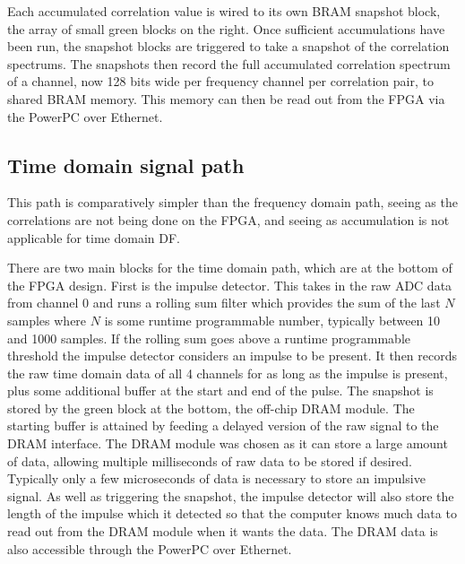 Each accumulated correlation value is wired to its own BRAM snapshot block, the array of small green blocks on the right. Once sufficient accumulations have been run, the snapshot blocks are triggered to take a snapshot of the correlation spectrums. The snapshots then record the full accumulated correlation spectrum of a channel, now 128 bits wide per frequency channel per correlation pair, to shared BRAM memory. This memory can then be read out from the FPGA via the PowerPC over Ethernet.

\subsection{Time domain signal path}
This path is comparatively simpler than the frequency domain path, seeing as the correlations are not being done on the FPGA, and seeing as accumulation is not applicable for time domain DF. 

There are two main blocks for the time domain path, which are at the bottom of the FPGA design. First is the impulse detector. This takes in the raw ADC data from channel 0 and runs a rolling sum filter which provides the sum of the last \(N\) samples where \(N\) is some runtime programmable number, typically between 10 and 1000 samples. If the rolling sum goes above a runtime programmable threshold the impulse detector considers an impulse to be present. It then records the raw time domain data of all 4 channels for as long as the impulse is present, plus some additional buffer at the start and end of the pulse.  The snapshot is stored by the green block at the bottom, the off-chip DRAM module. The starting buffer is attained by feeding a delayed version of the raw signal to the DRAM interface. The DRAM module was chosen as it can store a large amount of data, allowing multiple milliseconds of raw data to be stored if desired. Typically only a few microseconds of data is necessary to store an impulsive signal. As well as triggering the snapshot, the impulse detector will also store the length of the impulse which it detected so that the computer knows much data to read out from the DRAM module when it wants the data. The DRAM data is also accessible through the PowerPC over Ethernet.

